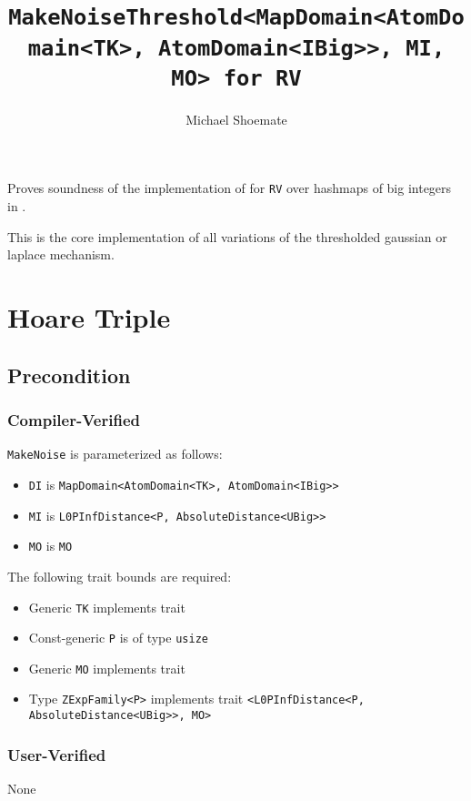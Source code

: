 \documentclass{article}
\title{\texttt{MakeNoiseThreshold<MapDomain<AtomDomain<TK>, AtomDomain<IBig>{}>, MI, MO> for RV}}
\author{Michael Shoemate}
\date{}
\begin{document}
\maketitle

\contrib
Proves soundness of the implementation of  
for \texttt{RV} over hashmaps of big integers in .

This is the core implementation of all variations of the thresholded gaussian or laplace mechanism.

\section{Hoare Triple}
\subsection*{Precondition}
\subsubsection*{Compiler-Verified}
\texttt{MakeNoise} is parameterized as follows:
\begin{itemize}
    \item \texttt{DI} is \texttt{MapDomain<AtomDomain<TK>, AtomDomain<IBig>{}>}
    \item \texttt{MI} is \texttt{L0PInfDistance<P, AbsoluteDistance<UBig>{}>}
    \item \texttt{MO} is \texttt{MO}
\end{itemize}

The following trait bounds are required:
\begin{itemize}
    \item Generic \texttt{TK} implements trait 
    \item Const-generic \texttt{P} is of type \texttt{usize}
    \item Generic \texttt{MO} implements trait 
    \item Type \texttt{ZExpFamily<P>} implements trait \texttt{<L0PInfDistance<P, AbsoluteDistance<UBig>{}>, MO>}
\end{itemize}

\subsubsection*{User-Verified}
None
\end{document}
